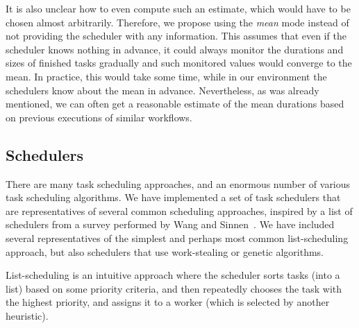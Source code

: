 \begin{description}[wide=0pt]
		It is also unclear how to even compute such an estimate, which would have to be chosen almost
		arbitrarily. Therefore, we propose using the \emph{mean} mode instead of not providing
		the scheduler with any information. This assumes that even if the scheduler knows nothing in
		advance, it could always monitor the durations and sizes of finished tasks gradually and such
		monitored values would converge to the mean. In practice, this would take some time, while in our
		environment the schedulers know about the mean in advance. Nevertheless, as was already mentioned,
		we can often get a reasonable estimate of the mean durations based on previous executions of
		similar workflows.
\end{description}

%

\subsection{Schedulers}
\label{subsec:estee-schedulers}
There are many task scheduling approaches, and an enormous number of various task scheduling
algorithms. We have implemented a set of task schedulers that are representatives of several common
scheduling approaches, inspired by a list of schedulers from a survey performed by Wang and
Sinnen~\cite{wang2018list}. We have included several representatives of the simplest and
perhaps most common list-scheduling approach, but also schedulers that use work-stealing or genetic
algorithms.

List-scheduling is an intuitive approach where the scheduler sorts tasks (into a list) based on
some priority criteria, and then repeatedly chooses the task with the highest priority, and assigns
it to a worker (which is selected by another heuristic).

